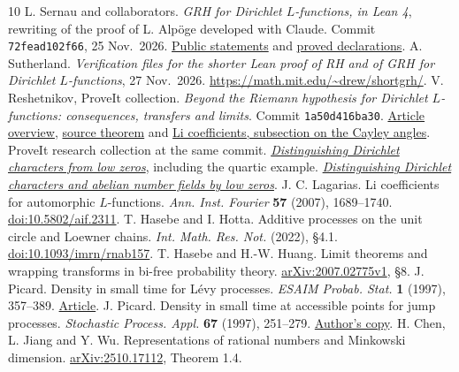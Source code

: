 \documentclass[11pt,letterpaper]{article}
\theoremstyle{plain}
\theoremstyle{definition}\newtheorem{example}[theorem]{Example}
\newcommand{\artbase}{https://github.com/VladimirReshetnikov/ProveIt/blob/1a50d416ba30b91595db12d7437f0328a32b0468/Analysis/GeneralizedRiemannHypothesis}
\newcommand{\leanbase}{https://github.com/lsernau/grh-lean/blob/72fead102f663d5c7a407964a13dc0cf9d977207/grh/src}
\begin{document}
\small
\begin{thebibliography}{10}
 L. Sernau and collaborators. \emph{GRH for Dirichlet $L$-functions, in Lean 4}, rewriting of the proof of L. Alp\"oge developed with Claude. Commit \texttt{72fead102f66}, 25 Nov.\ 2026.
\href{\leanbase/Statements.lean}{Public statements} and \href{\leanbase/Main.lean}{proved declarations}.
 A. Sutherland. \emph{Verification files for the shorter Lean proof of RH and of GRH for Dirichlet $L$-functions}, 27 Nov.\ 2026. \url{https://math.mit.edu/~drew/shortgrh/}.
 V. Reshetnikov, ProveIt collection. \emph{Beyond the Riemann hypothesis for Dirichlet $L$-functions: consequences, transfers and limits}. Commit \texttt{1a50d416ba30}.
\href{\artbase/Article/README.md}{Article overview},
\href{\artbase/Article/sections/src.tex}{source theorem} and
\href{\artbase/Article/sections/li.tex}{Li coefficients, subsection on the Cayley angles}.
 ProveIt research collection at the same commit.
\href{\artbase/Research/dirichlet_low_zero_identification/character_zeros.tex}{\emph{Distinguishing Dirichlet characters from low zeros}}, including the quartic example.
\href{\artbase/Research/dirichlet_zeros_and_abelian_fields/zero_windows.tex}{\emph{Distinguishing Dirichlet characters and abelian number fields by low zeros}}.
 J. C. Lagarias. Li coefficients for automorphic $L$-functions. \emph{Ann. Inst. Fourier} \textbf{57} (2007), 1689--1740. \href{https://doi.org/10.5802/aif.2311}{doi:10.5802/aif.2311}.
 T. Hasebe and I. Hotta. Additive processes on the unit circle and Loewner chains. \emph{Int. Math. Res. Not.} (2022), \S4.1. \href{https://doi.org/10.1093/imrn/rnab157}{doi:10.1093/imrn/rnab157}.
 T. Hasebe and H.-W. Huang. Limit theorems and wrapping transforms in bi-free probability theory. \href{https://arxiv.org/abs/2007.02775v1}{arXiv:2007.02775v1}, \S8.
 J. Picard. Density in small time for L\'evy processes. \emph{ESAIM Probab. Stat.} \textbf{1} (1997), 357--389. \href{https://www.numdam.org/item/PS_1997__1__357_0/}{Article}.
 J. Picard. Density in small time at accessible points for jump processes. \emph{Stochastic Process. Appl.} \textbf{67} (1997), 251--279. \href{https://lmbp.uca.fr/~picard/small_time.pdf}{Author's copy}.
 H. Chen, L. Jiang and Y. Wu. Representations of rational numbers and Minkowski dimension. \href{https://arxiv.org/abs/2510.17112}{arXiv:2510.17112}, Theorem 1.4.
\end{thebibliography}
\end{document}
